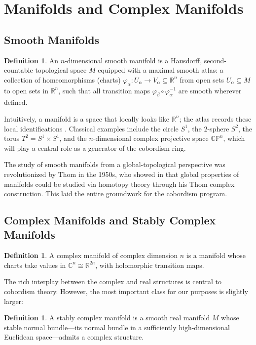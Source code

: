 \documentclass[12pt]{article}
\theoremstyle{definition}
\newtheorem{definition}[theorem]{Definition}
\theoremstyle{remark}
\newcommand{\R}{\mathbb{R}}
\newcommand{\C}{\mathbb{C}}
\newcommand{\CP}{\mathbb{CP}}
\begin{document}
\section{Manifolds and Complex Manifolds}\label{sec:manifolds}

\subsection{Smooth Manifolds}

\begin{definition}
An $n$-dimensional smooth manifold is a Hausdorff, second-countable topological space $M$ equipped with a maximal smooth atlas: a collection of homeomorphisms (charts) $\varphi_\alpha : U_\alpha \to V_\alpha \subseteq \R^n$ from open sets $U_\alpha \subseteq M$ to open sets in $\R^n$, such that all transition maps $\varphi_\beta \circ \varphi_\alpha^{-1}$ are smooth wherever defined.
\end{definition}

Intuitively, a manifold is a space that locally looks like $\R^n$; the atlas records these local identifications \cite{Lee13}. Classical examples include the circle $S^1$, the $2$-sphere $S^2$, the torus $T^2 = S^1 \times S^1$, and the $n$-dimensional complex projective space $\CP^n$, which will play a central role as a generator of the cobordism ring.

The study of smooth manifolds from a global-topological perspective was revolutionized by Thom in the 1950s, who showed in \cite{Tho54} that global properties of manifolds could be studied via homotopy theory through his Thom complex construction. This laid the entire groundwork for the cobordism program.

\subsection{Complex Manifolds and Stably Complex Manifolds}

\begin{definition}
A complex manifold of complex dimension $n$ is a manifold whose charts take values in $\C^n \cong \R^{2n}$, with holomorphic transition maps.
\end{definition}

The rich interplay between the complex and real structures is central to cobordism theory. However, the most important class for our purposes is slightly larger:

\begin{definition}
A stably complex manifold is a smooth real manifold $M$ whose stable normal bundle---its normal bundle in a sufficiently high-dimensional Euclidean space---admits a complex structure.
\end{definition}
\end{document}
